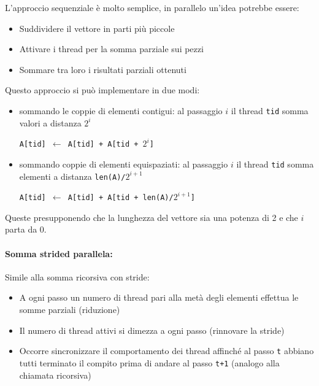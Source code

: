 L'approccio sequenziale è molto semplice, in parallelo un'idea potrebbe essere:
\begin{itemize}
	\item Suddividere il vettore in parti più piccole
	
	\item Attivare i thread per la somma parziale sui pezzi 
	
	\item Sommare tra loro i risultati parziali ottenuti
\end{itemize}

Questo approccio si può implementare in due modi:
\begin{itemize}
	\item sommando le coppie di elementi contigui: al passaggio $i$ il thread \texttt{tid} somma valori a distanza $2^i$
    \begin{center}
        \texttt{A[tid] $\leftarrow$ A[tid] + A[tid + $2^i$]}
    \end{center}
	
	\item sommando coppie di elementi equispaziati: al passaggio $i$ il thread \texttt{tid} somma elementi a distanza \texttt{len(A)/$2^{i+1}$}
    \begin{center}
        \texttt{A[tid] $\leftarrow$ A[tid] + A[tid + len(A)/$2^{i+1}$]}
    \end{center}
\end{itemize}

Queste presupponendo che la lunghezza del vettore sia una potenza di 2 e che $i$ parta da 0.

\paragraph{Somma strided parallela:} Simile alla somma ricorsiva con stride:
\begin{itemize}
	\item A ogni passo un numero di thread pari alla metà degli elementi effettua le somme parziali (riduzione)
	
	\item Il numero di thread attivi si dimezza a ogni passo (rinnovare la stride)
	
	\item Occorre sincronizzare il comportamento dei thread affinché al passo \texttt{t} abbiano tutti terminato il compito prima di andare al passo \texttt{t+1} (analogo alla chiamata ricorsiva) 
\end{itemize}

